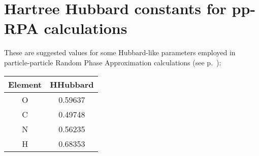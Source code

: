 \chapter{Hartree Hubbard constants for pp-RPA calculations}
\label{app:hhubbard}

These are suggested values for some Hubbard-like parameters employed in particle-particle Random Phase Approximation calculations (see
p.~):

\begin{center}
\begin{tabular}{cc} \hline
Element & HHubbard \\
\hline
O & 0.59637 \\
C & 0.49748 \\
N & 0.56235 \\
H & 0.68353 \\
\hline
\end{tabular}
\end{center}